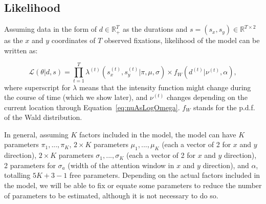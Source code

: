 \documentclass{article}
\begin{document}
\subsection{Likelihood}


Assuming data in the form of $d \in \mathbb{R}_+^T$ as the durations and $s = (s_x, s_y) \in \mathbb{R}^{T\times2}$ as the $x$ and $y$ coordinates of $T$ observed fixations, likelihood of the model can be written as:

\begin{equation}
    \mathcal{L}(\theta | d, s) = \prod_{t=1}^T \lambda^{(t)}(s_x^{(t)}, s_y^{(t)} | \pi, \mu, \sigma) \times f_{W}(d^{(t)} | \nu^{(t)}, \alpha),
\end{equation}
where superscript for $\lambda$ means that the intensity function might change during the course of time (which we show later), and $\nu^{(t)}$ changes depending on the current location through Equation~\ref{eq:nuAsLogOmega}. $f_W$ stands for the p.d.f. of the Wald distribution.

In general, assuming $K$ factors included in the model, the model can have $K$ parameters $\pi_1, ..., \pi_K$, $2\times K$ parameters $\mu_1, ..., \mu_K$ (each a vector of 2 for $x$ and $y$ direction), $2\times K$ parameters $\sigma_1, ..., \sigma_K$ (each a vector of 2 for $x$ and $y$ direction), 2 parameters for $\sigma_a$ (width of the attention window in $x$ and $y$ direction), and $\alpha$, totalling $5K + 3 - 1$ free parameters. Depending on the actual factors included in the model, we will be able to fix or equate some parameters to reduce the number of parameters to be estimated, although it is not necessary to do so.




\end{document}
